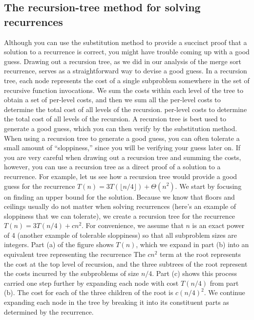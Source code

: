 \documentclass{report}
\begin{document}
        \subsection{The recursion-tree method for solving recurrences}
        \bigbreak \noindent 
        Although you can use the substitution method to provide a succinct proof that
        a solution to a recurrence is correct, you might have trouble coming up with a
        good guess. Drawing out a recursion tree, as we did in our analysis of the merge
        sort recurrence, serves as a straightforward way to devise a good
        guess. In a recursion tree, each node represents the cost of a single subproblem
        somewhere in the set of recursive function invocations. We sum the costs within
        each level of the tree to obtain a set of per-level costs, and then we sum all the
        per-level costs to determine the total cost of all levels of the recursion.
        \bigbreak \noindent 
        per-level costs to determine the total cost of all levels of the recursion.
        A recursion tree is best used to generate a good guess, which you can then verify
        by the substitution method. When using a recursion tree to generate a good guess,
        you can often tolerate a small amount of “sloppiness,” since you will be verifying
        your guess later on. If you are very careful when drawing out a recursion tree and
        summing the costs, however, you can use a recursion tree as a direct proof of a
        solution to a recurrence.
        \bigbreak \noindent 
        For example, let us see how a recursion tree would provide a good guess for the recurrence $T(n) = 3T\left(\lfloor n/4\rfloor\right)  + \Theta(n^{2})$. We start by focusing on finding an upper bound for the solution. Because we know that floors and ceilings usually do not matter when solving recurrences (here’s an example of sloppiness that we can tolerate), we create a recursion tree for the recurrence $T(n) = 3T(n /4) + cn^{2}$. For convenience, we assume that $n$ is an exact power of 4 (another example of tolerable sloppiness) so that all subproblem sizes are integers.
        \bigbreak \noindent 
        Part (a) of the figure shows $T(n) $, which we expand in part (b) into an equivalent tree representing the recurrence
        The \( cn^2 \) term at the root represents the cost at the top level of recursion, and the three subtrees of the root represent the costs incurred by the subproblems of size \( n/4 \). Part (c) shows this process carried one step further by expanding each node with cost \( T(n/4) \) from part (b). The cost for each of the three children of the root is \( c(n/4)^2 \). We continue expanding each node in the tree by breaking it into its constituent parts as determined by the recurrence.
\end{document}
